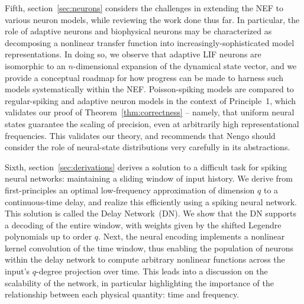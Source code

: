 Fifth, section~\ref{sec:neurons} considers the challenges in extending the NEF to various neuron models, while reviewing the work done thus far.
In particular, the role of adaptive neurons and biophysical neurons may be characterized as decomposing a nonlinear transfer function into increasingly-sophisticated model representations.
In doing so, we observe that adaptive LIF neurons are isomorphic to an $n$-dimensional expansion of the dynamical state vector, and we provide a conceptual roadmap for how progress can be made to harness such models systematically within the NEF.
Poisson-spiking models are compared to regular-spiking and adaptive neuron models in the context of Principle~1, which validates our proof of Theorem~\ref{thm:correctness} -- namely, that uniform neural states guarantee the scaling of precision, even at arbitrarily high representational frequencies.
This validates our theory, and recommends that Nengo should consider the role of neural-state distributions very carefully in its abstractions.

Sixth, section~\ref{sec:derivations} derives a solution to a difficult task for spiking neural networks: maintaining a sliding window of input history.
We derive from first-principles an optimal low-frequency approximation of dimension $q$ to a continuous-time delay, and realize this efficiently using a spiking neural network.
This solution is called the Delay Network~(DN).
We show that the DN supports a decoding of the entire window, with weights given by the shifted Legendre polynomials up to order $q$.
Next, the neural encoding implements a nonlinear kernel convolution of the time window, thus enabling the population of neurons within the delay network to compute arbitrary nonlinear functions across the input's $q$-degree projection over time.
This leads into a discussion on the scalability of the network, in particular highlighting the importance of the relationship between each physical quantity: time and frequency.

